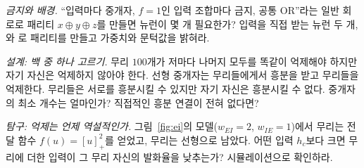 \begin{exercise}[\lvlB]
\label{ex:03:6}
\emph{금지와 배경.} “입력마다  중개자, $f=1$인 입력 조합마다 금지, 공통 OR”라는 일반 회로로 패리티 $x\oplus y\oplus z$를 만들면 뉴런이 몇 개 필요한가? 입력을 직접 받는 뉴런 두 개, 와 로 패리티를 만들고 가중치와 문턱값을 밝혀라.
\end{exercise}

\begin{exercise}[\lvlC]
\label{ex:03:7}
\emph{설계: 백 중 하나 고르기.}  무리 $100$개가 저마다 나머지 모두를 똑같이 억제해야 하지만 자기 자신은 억제하지 않아야 한다. 선형  중개자는 무리들에게서 흥분을 받고 무리들을 억제한다. 무리들은 서로를 흥분시킬 수 있지만 자기 자신은 흥분시킬 수 없다. 중개자의 최소 개수는 얼마인가? 직접적인 흥분 연결이 전혀 없다면?
\end{exercise}

\begin{exercise}[\lvlC]
\label{ex:03:8}
\emph{탐구: 억제는 언제 역설적인가.} 그림~\ref{fig:ei}의 모델($w_{EI}=2$, $w_{IE}=1$)에서  무리는 전달 함수 $f(u)=[u]_+^2$를 얻었고,  무리는 선형으로 남았다. 어떤 입력 $h_c$보다 크면  무리에 더한 입력이 그 무리 자신의 발화율을 낮추는가? 시뮬레이션으로 확인하라.
\end{exercise}
